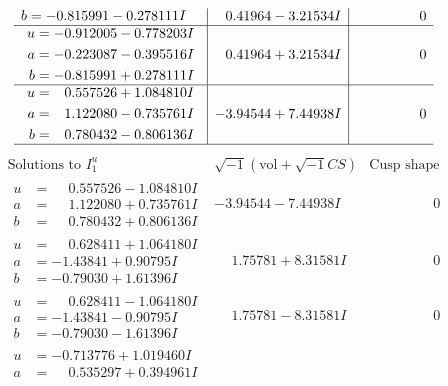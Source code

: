 \documentclass[1p]{elsarticle_modified}
\theoremstyle{definition}
\newcommand{\I}{\sqrt{-1}}
\begin{document}
$$\begin{array}{c|c|c}
\begin{aligned}
b &= -0.815991 - 0.278111 I\end{aligned}
 & \phantom{-}0.41964 - 3.21534 I & \phantom{-0.000000 } 0 \\ \hline\begin{aligned}
u &= -0.912005 - 0.778203 I \\
a &= -0.223087 - 0.395516 I \\
b &= -0.815991 + 0.278111 I\end{aligned}
 & \phantom{-}0.41964 + 3.21534 I & \phantom{-0.000000 } 0 \\ \hline\begin{aligned}
u &= \phantom{-}0.557526 + 1.084810 I \\
a &= \phantom{-}1.122080 - 0.735761 I \\
b &= \phantom{-}0.780432 - 0.806136 I\end{aligned}
 & -3.94544 + 7.44938 I & \phantom{-0.000000 } 0\\
 \hline 
 \end{array}$$\newpage$$\begin{array}{c|c|c}  
\text{Solutions to }I^u_{1}& \I (\text{vol} + \sqrt{-1}CS) & \text{Cusp shape}\\
 \hline 
\begin{aligned}
u &= \phantom{-}0.557526 - 1.084810 I \\
a &= \phantom{-}1.122080 + 0.735761 I \\
b &= \phantom{-}0.780432 + 0.806136 I\end{aligned}
 & -3.94544 - 7.44938 I & \phantom{-0.000000 } 0 \\ \hline\begin{aligned}
u &= \phantom{-}0.628411 + 1.064180 I \\
a &= -1.43841 + 0.90795 I \\
b &= -0.79030 + 1.61396 I\end{aligned}
 & \phantom{-}1.75781 + 8.31581 I & \phantom{-0.000000 } 0 \\ \hline\begin{aligned}
u &= \phantom{-}0.628411 - 1.064180 I \\
a &= -1.43841 - 0.90795 I \\
b &= -0.79030 - 1.61396 I\end{aligned}
 & \phantom{-}1.75781 - 8.31581 I & \phantom{-0.000000 } 0 \\ \hline\begin{aligned}
u &= -0.713776 + 1.019460 I \\
a &= \phantom{-}0.535297 + 0.394961 I \\

\end{aligned}
\end{array}$$
\end{document}
